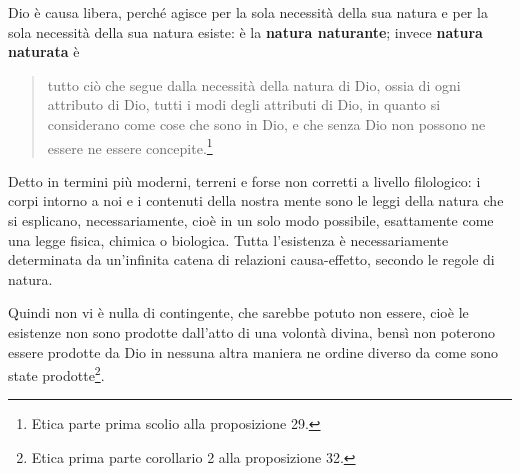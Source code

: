 Dio è causa libera, perché agisce per la sola necessità della sua natura e per la sola necessità della sua natura esiste: è la \textbf{natura naturante}; invece \textbf{natura naturata} è 
\begin{quotation}
	\small tutto ciò che segue dalla necessità della natura di Dio, ossia di ogni attributo di Dio, tutti i modi degli attributi di Dio, in quanto si considerano come cose che sono in Dio, e che senza Dio non possono ne essere ne essere concepite.\footnote{Etica parte prima scolio alla proposizione 29.}
\end{quotation}

Detto in termini più moderni, terreni e forse non corretti a livello filologico: i corpi intorno a noi e i contenuti della nostra mente sono le leggi della natura che si esplicano, necessariamente, cioè in un solo modo possibile, esattamente come una legge fisica, chimica o biologica. Tutta l'esistenza è necessariamente determinata da un'infinita catena di relazioni causa-effetto, secondo le regole di natura. 

Quindi non vi è nulla di contingente, che sarebbe potuto non essere, cioè le esistenze non sono prodotte dall'atto di una volontà divina, bensì non poterono essere prodotte da Dio in nessuna altra maniera ne ordine diverso da come sono state prodotte\footnote{Etica prima parte corollario 2 alla proposizione 32.}.


